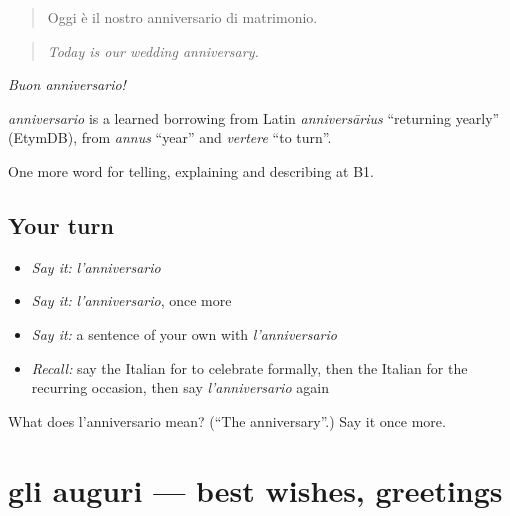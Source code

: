\begin{quote}
Oggi è il nostro anniversario di matrimonio.
\end{quote}

\begin{quote}
\emph{Today is our wedding anniversary.}
\end{quote}

\emph{Buon anniversario!}

\begin{cousinweb}
\emph{anniversario} is a learned borrowing from Latin \emph{anniversārius} \textquotedblleft{}returning yearly\textquotedblright{} (EtymDB), from \emph{annus} \textquotedblleft{}year\textquotedblright{} and \emph{vertere} \textquotedblleft{}to turn\textquotedblright{}.
\end{cousinweb}

\begin{grammarlens}[title={What you've built}]
One more word for telling, explaining and describing at B1.
\end{grammarlens}

\subsection*{Your turn}
\begin{itemize}
\raggedright
  \item \emph{Say it:} \emph{l'anniversario}
  \item \emph{Say it:} \emph{l'anniversario}, once more
  \item \emph{Say it:} a sentence of your own with \emph{l'anniversario}
  \item \emph{Recall:} say the Italian for to celebrate formally, then the Italian for the recurring occasion, then say \emph{l'anniversario} again
\end{itemize}

\begin{tcolorbox}[breakable,colback=teal!4,colframe=teal!35!black,title={Before you move on}]
What does l'anniversario mean? (\textquotedblleft{}The anniversary\textquotedblright{}.) Say it once more.
\end{tcolorbox}
\section[gli auguri]{gli auguri — best wishes, greetings}

\label{lesson:IT-C315-auguri}



